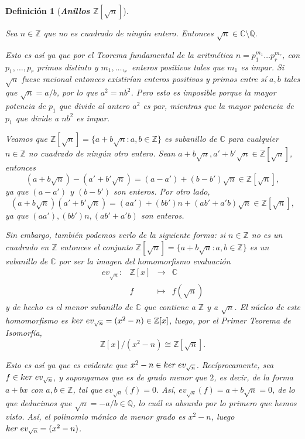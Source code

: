 \documentclass[12pt]{article}
\newtheorem{definition}[theorem]{Definición}
\begin{document}
\begin{definition}[\textbf{\textit{Anillos $\mathbb{Z}[\sqrt{n}]$}}] \label{def:ard}

Sea $n \in \mathbb{Z}$ que no es cuadrado de ningún entero. Entonces $\sqrt{n} \in \mathbb{C} \setminus \mathbb{Q}.$

Esto es así ya que por el \textit{Teorema fundamental de la aritmética} $n = p_1^{m_1}\ldots p_r^{m_r}$, con $p_1, \ldots, p_r$ primos distinto y $m_1, \ldots, _r$ enteros positivos tales que $m_1$ es impar. Si $\sqrt{n}$ fuese racional entonces existirían enteros positivos y primos entre sí $a,b$ tales que $\sqrt{n} = a/b$, por lo que $a^2 = nb^2$. Pero esto es imposible porque la mayor potencia de $p_1$ que divide al antero $a^2$ es par, mientras que la mayor potencia de $p_1$ que divide a $nb^2$ es impar.

Veamos que $\mathbb{Z}[\sqrt{n}] = \lbrace a + b\sqrt{n}:a,b \in \mathbb{Z}\rbrace$ es subanillo de $\mathbb{C}$ para cualquier $n \in \mathbb{Z}$ no cuadrado de ningún otro entero. Sean $a+b\sqrt{n}, a'+b'\sqrt{n} \in  \mathbb{Z}[\sqrt{n}]$, entonces $$(a+b\sqrt{n})- (a'+b'\sqrt{n}) = (a-a') + (b-b')\sqrt{n} \in \mathbb{Z}[\sqrt{n}],$$ ya que $(a-a')$ y $(b-b')$ son enteros. Por otro lado, $$(a+b\sqrt{n})(a'+b'\sqrt{n}) = (aa') + (bb')n +(ab'+a'b)\sqrt{n} \in \mathbb{Z}[\sqrt{n}],$$  ya que $(aa'),(bb')n,(ab'+a'b)$ son enteros.

Sin embargo, también podemos verlo de la siguiente forma: si $n \in \mathbb{Z}$ no es un cuadrado en $\mathbb{Z}$ entonces el conjunto $\mathbb{Z}[\sqrt{n}]=\lbrace a + b \sqrt{n}:a,b \in \mathbb{Z} \rbrace $ es un subanillo de $\mathbb{C}$ por ser la imagen del homomorfismo evaluación $$\begin{array}{rccl}
ev_{\sqrt{n}} \colon &\mathbb{Z}[x]&\longrightarrow &\mathbb{C} \\
&f& \longmapsto &f(\sqrt{n})
\end{array}
$$
y de hecho es el menor subanillo de $\mathbb{C}$ que contiene a $\mathbb{Z}$ y a $\sqrt{n}$. El núcleo de este homomorfismo es $ker \hspace{0.1cm} ev_{\sqrt{n}} = (x^2-n) \in \mathbb{Z}[x]$, luego, por el \textit{Primer Teorema de Isomorfía}, $$\mathbb{Z}[x]/(x^2-n) \cong \mathbb{Z}[\sqrt{n}].$$

Esto es así ya que es evidente que $x^2-n \in ker \hspace{0.1cm} ev_{\sqrt{n}}$. Recíprocamente, sea $f \in ker \hspace{0.1cm} ev_{\sqrt{n}}$, y supongamos que es de grado menor que $2$, es decir, de la forma $a+bx$ con $a,b \in \mathbb{Z}$, tal que $ev_{\sqrt{n}}(f)=0$. Así, $ev_{\sqrt{n}}(f)=a+b\sqrt{n} = 0$, de lo que deducimos que $\sqrt{n} = -a/b \in \mathbb{Q}$, lo cuál es absurdo por lo primero que hemos visto. Así, el polinomio mónico de menor grado es $x^2-n$, luego $ker \hspace{0.1cm} ev_{\sqrt{n}} = (x^2-n)$.


\end{definition}
\end{document}
